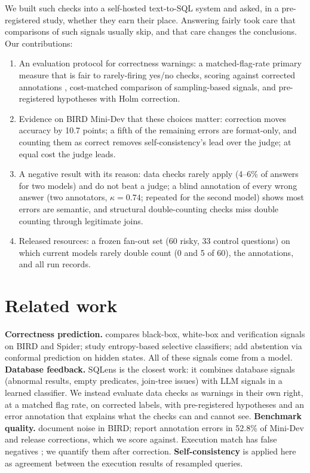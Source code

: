 \documentclass[10pt,twocolumn]{article}
\begin{document}
We built such checks into a self-hosted text-to-SQL system and asked, in a pre-registered study,
whether they earn their place. Answering fairly took care that comparisons of such signals usually
skip, and that care changes the conclusions. Our contributions:
\begin{enumerate}\setlength{\itemsep}{0pt}
\item An evaluation protocol for correctness warnings: a matched-flag-rate primary measure that is fair
to rarely-firing yes/no checks, scoring against corrected annotations \citep{jin2026annotation},
cost-matched comparison of sampling-based signals, and pre-registered hypotheses with Holm correction.
\item Evidence on BIRD Mini-Dev \citep{li2023bird} that these choices matter: correction moves accuracy
by 10.7 points; a fifth of the remaining errors are format-only, and counting them as correct removes
self-consistency's lead over the judge; at equal cost the judge leads.
\item A negative result with its reason: data checks rarely apply (4--6\% of answers for two models) and
do not beat a judge; a blind annotation of every wrong answer (two annotators, $\kappa=0.74$; repeated
for the second model) shows most errors are semantic, and structural double-counting checks miss
double counting through legitimate joins.
\item Released resources: a frozen fan-out set (60 risky, 33 control questions) on which current models
rarely double count (0 and 5 of 60), the annotations, and all run records.
\end{enumerate}

\section{Related work}

\textbf{Correctness prediction.} \citet{richardson2026predicts} compares black-box, white-box and
verification signals on BIRD and Spider; \citet{somov2025confidence} study entropy-based selective
classifiers; \citet{chen2025abstention} add abstention via conformal prediction on hidden states. All
of these signals come from a model. \textbf{Database feedback.} SQLens \citep{gong2025sqlens} is the
closest work: it combines database signals (abnormal results, empty predicates, join-tree issues) with
LLM signals in a learned classifier. We instead evaluate data checks as warnings in their own right,
at a matched flag rate, on corrected labels, with pre-registered hypotheses and an error annotation
that explains what the checks can and cannot see. \textbf{Benchmark quality.}
\citet{wretblad2024noise} document noise in BIRD; \citet{jin2026annotation} report annotation errors
in 52.8\% of Mini-Dev and release corrections, which we score against. Execution match has false
negatives \citep{pourreza2023evaluating,kim2025flex}; we quantify them after correction.
\textbf{Self-consistency} \citep{wang2023selfconsistency} is applied here as agreement between the
execution results of resampled queries.
\end{document}
